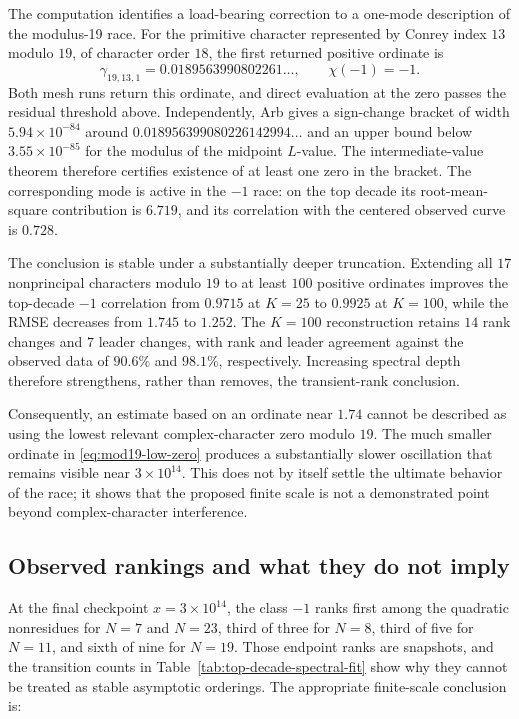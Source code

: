The computation identifies a load-bearing correction to a one-mode
description of the modulus-19 race.  For the primitive character represented
by Conrey index $13$ modulo $19$, of character order $18$, the first returned
positive ordinate is
\begin{equation}
  \gamma_{19,13,1}=0.0189563990802261\ldots,
  \qquad \chi(-1)=-1.
  \label{eq:mod19-low-zero}
\end{equation}
Both mesh runs return this ordinate, and direct evaluation at the zero passes
the residual threshold above.  Independently, Arb gives a sign-change bracket
of width $5.94\times10^{-84}$ around
$0.018956399080226142994\ldots$ and an upper bound below
$3.55\times10^{-85}$ for the modulus of the midpoint $L$-value.  The
intermediate-value theorem therefore certifies existence of at least one zero
in the bracket.  The corresponding mode is active in the $-1$ race: on the
top decade its root-mean-square contribution is $6.719$, and its correlation
with the centered observed curve is $0.728$.

The conclusion is stable under a substantially deeper truncation.  Extending
all $17$ nonprincipal characters modulo $19$ to at least $100$ positive
ordinates improves the top-decade $-1$ correlation from $0.9715$ at $K=25$
to $0.9925$ at $K=100$, while the RMSE decreases from $1.745$ to $1.252$.
The $K=100$ reconstruction retains $14$ rank changes and $7$ leader changes,
with rank and leader agreement against the observed data of $90.6\%$ and
$98.1\%$, respectively.  Increasing spectral depth therefore strengthens,
rather than removes, the transient-rank conclusion.

Consequently, an estimate based on an ordinate near $1.74$ cannot be described
as using the lowest relevant complex-character zero modulo $19$.  The much
smaller ordinate in \eqref{eq:mod19-low-zero} produces a substantially slower
oscillation that remains visible near $3\times10^{14}$.  This does not by
itself settle the ultimate behavior of the race; it shows that the proposed
finite scale is not a demonstrated point beyond complex-character
interference.

\subsection{Observed rankings and what they do not imply}

At the final checkpoint $x=3\times10^{14}$, the class $-1$ ranks first among
the quadratic nonresidues for $N=7$ and $N=23$, third of three for $N=8$,
third of five for $N=11$, and sixth of nine for $N=19$.  Those endpoint ranks
are snapshots, and the transition counts in
Table~\ref{tab:top-decade-spectral-fit} show why they cannot be treated as
stable asymptotic orderings.  The appropriate finite-scale conclusion is:

